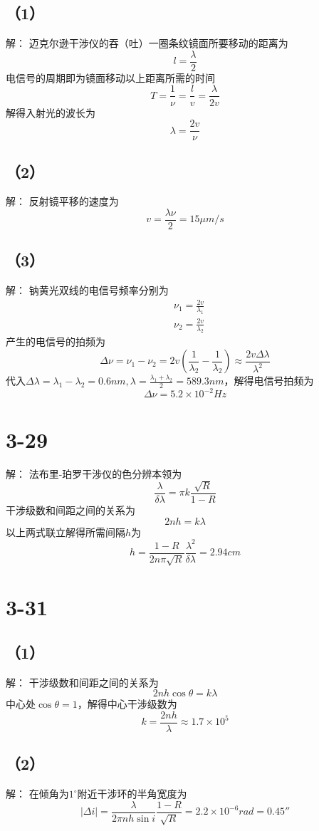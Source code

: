\documentclass[10pt,a4paper]{article}
\begin{document}
\subsection*{（1）}解：
迈克尔逊干涉仪的吞（吐）一圈条纹镜面所要移动的距离为
\[
l = \frac{\lambda}{2}
\]
电信号的周期即为镜面移动以上距离所需的时间
\[
T = \frac{1}{\nu} = \frac{l}{v} = \frac{\lambda}{2v}
\]
解得入射光的波长为
\[
\lambda = \frac{2v}{\nu}
\]
\subsection*{（2）}解：
反射镜平移的速度为
\[
v = \frac{\lambda\nu}{2} = 15\mu m/s
\]
\subsection*{（3）}解：
钠黄光双线的电信号频率分别为
\begin{align*}
&\nu_1 = \frac{2v}{\lambda_1}\\
&\nu_2 = \frac{2v}{\lambda_2}
\end{align*}
产生的电信号的拍频为
\[
\Delta\nu = \nu_1 - \nu_2 = 2v(\frac{1}{\lambda_2} - \frac{1}{\lambda_2}) \approx \frac{2v\Delta\lambda}{\lambda^2}
\]
代入$\Delta\lambda = \lambda_1-\lambda_2 = 0.6nm, \lambda = \frac{\lambda_1+\lambda_2}{2} = 589.3nm$，解得电信号拍频为
\[
\Delta\nu = 5.2\times10^{-2}Hz
\]
\section*{3-29}解：
法布里-珀罗干涉仪的色分辨本领为
\[
\frac{\lambda}{\delta\lambda} = \pi k\frac{\sqrt{R}}{1-R}
\]
干涉级数和间距之间的关系为
\[
2nh = k\lambda
\]
以上两式联立解得所需间隔$h$为
\[
h = \frac{1-R}{2n\pi\sqrt{R}}\frac{\lambda^2}{\delta\lambda} = 2.94cm
\]
\section*{3-31}
\subsection*{（1）}解：
干涉级数和间距之间的关系为
\[
2nh\cos\theta = k\lambda
\]
中心处$\cos\theta = 1$，解得中心干涉级数为
\[
k = \frac{2nh}{\lambda} \approx 1.7\times10^5
\]
\subsection*{（2）}解：
在倾角为$1^\circ$附近干涉环的半角宽度为
\[
|\Delta i| = \frac{\lambda}{2\pi nh\sin i}\frac{1-R}{\sqrt{R}} = 2.2\times10^{-6}rad = 0.45''
\]
\end{document}
